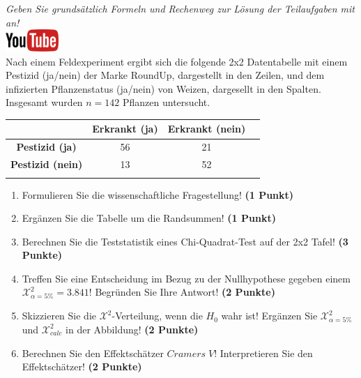 \documentclass[a4paper, 9pt]{scrartcl}\usepackage[]{graphicx}\usepackage[]{xcolor}
\begin{document}
\textit{Geben Sie grunds{\"a}tzlich Formeln und Rechenweg zur L{\"o}sung der
  Teilaufgaben mit an!} \\[1Ex]

\hfill\href{https://youtu.be/-Kva5wc5Elw}{\includegraphics[width =
  2cm]{img/youtube}}\\[1Ex]




Nach einem Feldexperiment ergibt sich die folgende 2x2 Datentabelle mit einem
Pestizid (ja/nein) der Marke RoundUp, dargestellt in den Zeilen, und
dem infizierten Pflanzenstatus (ja/nein) von Weizen, dargesellt in
den Spalten. Insgesamt wurden $n = 142$ Pflanzen untersucht.
\vspace{5Ex}

\begin{center}
  \Large
  \begin{tabular}{c|c|c|c}
     & \textbf{Erkrankt (ja)} & \textbf{Erkrankt (nein)} &  \strut\\
    \hline
    \textbf{Pestizid (ja)} & 56  & 21  &     \strut\\
    \hline
    \textbf{Pestizid (nein)} & 13  & 52  &      \strut\\
    \hline
     \phantom{100} & \phantom{100}  & \phantom{100}  &  \phantom{100}  \strut\\
  \end{tabular}
\end{center}

\vspace{5Ex}

\begin{enumerate}
\item Formulieren Sie die wissenschaftliche Fragestellung! \textbf{(1 Punkt)}
\item Erg{\"a}nzen Sie die Tabelle um die Randsummen! \textbf{(1 Punkt)} 
\item Berechnen Sie die Teststatistik eines Chi-Quadrat-Test auf der 2x2
  Tafel! \textbf{(3 Punkte)}
\item Treffen Sie eine Entscheidung im Bezug zu der Nullhypothese gegeben
  einem $\mathcal{X}^2_{\alpha = 5\%} = 3.841$! Begr{\"u}nden Sie Ihre Antwort!
  \textbf{(2 Punkte)}
\item Skizzieren Sie die $\mathcal{X}^2$-Verteilung, wenn die $H_0$ wahr
  ist! Erg{\"a}nzen Sie  $\mathcal{X}^2_{\alpha = 5\%}$ und
  $\mathcal{X}^2_{calc}$ in der Abbildung! \textbf{(2 Punkte)}
\item Berechnen Sie den Effektsch{\"a}tzer $Cramers\; V$! Interpretieren Sie den
  Effektsch{\"a}tzer! \textbf{(2 Punkte)}
\end{enumerate} 
\clearpage
\end{document}
